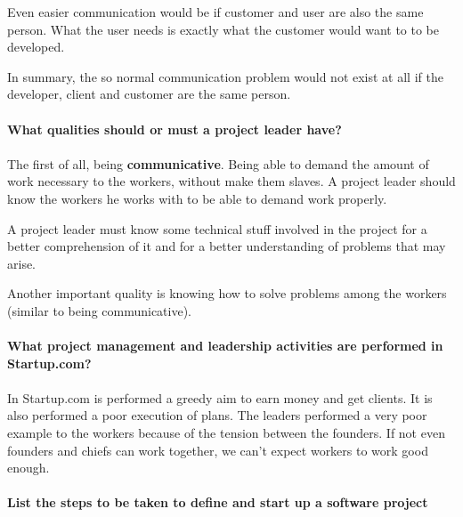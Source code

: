 \documentclass{article}
\begin{document}
Even easier communication would be if customer and user are also the same person. What the user needs is exactly what the customer would want to to be developed.

In summary, the so normal communication problem would not exist at all if the developer, client and customer are the same person.

\paragraph{What qualities should or must a project leader have?}
\paragraph{}
The first of all, being \textbf{communicative}. Being able to demand the amount of work necessary to the workers, without make them slaves. A project leader should know the workers he works with to be able to demand work properly.

A project leader must know some technical stuff involved in the project for a better comprehension of it and for a better understanding of problems that may arise.

Another important quality is knowing how to solve problems among the workers (similar to being communicative).


\paragraph{What project management and leadership activities are performed in Startup.com?}
\paragraph{}

In Startup.com is performed a greedy aim to earn money and get clients. It is also performed a poor execution of plans. The leaders performed a very poor example to the workers because of the tension between the founders. If not even founders and chiefs can work together, we can't expect workers to work good enough.

\paragraph{List the steps to be taken to define and start up a software project}
\paragraph{}
\end{document}
